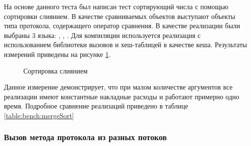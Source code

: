 На основе данного теста был написан тест сортирующий числа с помощью сортировки слиянием\cite{merge_sort}. В качестве сравниваемых объектов выступают объекты типа протокола, содержащего оператор сравнения. В качестве реализации были выбраны 3  языка: , , . Для компиляции  используется реализация с использованием библиотеки вызовов и хеш-таблицей в качестве кеша. Результаты измерений приведены на рисунке \ref{plot:bench:mergeSort}.

\begin{figure}
\caption{\label{plot:bench:mergeSort} Сортировка слиянием}
\end{figure}

Данное измерение демонстрирует, что при малом количестве аргументов все реализации имеют константные накладные расходы и работают примерно одно время. Подробное сравнение реализаций приведено в таблице \ref{table:bench:mergeSort}

\subsubsection{Вызов метода протокола из разных потоков}
